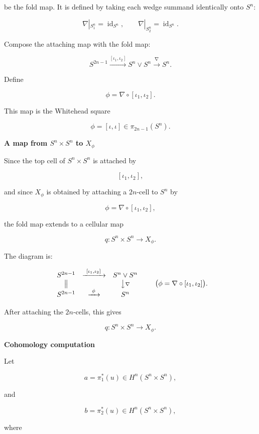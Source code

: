 \begin{solution}
be the fold map. It is defined by taking each wedge summand identically onto \(S^n\):

\[
\nabla|_{S^n_1}=\operatorname{id}_{S^n},
\qquad
\nabla|_{S^n_2}=\operatorname{id}_{S^n}.
\]

Compose the attaching map with the fold map:

\[
S^{2n-1}
\xrightarrow{[\iota_1,\iota_2]}
S^n\vee S^n
\xrightarrow{\nabla}
S^n.
\]

Define

\[
\phi=\nabla\circ[\iota_1,\iota_2].
\]

This map is the Whitehead square

\[
\phi=[\iota,\iota]\in \pi_{2n-1}(S^n).
\]


\medskip
\noindent\textbf{A map from \(S^n\times S^n\) to \(X_\phi\)}\par
\smallskip


Since the top cell of \(S^n\times S^n\) is attached by

\[
[\iota_1,\iota_2],
\]

and since \(X_\phi\) is obtained by attaching a \(2n\)-cell to \(S^n\) by

\[
\phi=\nabla\circ[\iota_1,\iota_2],
\]

the fold map extends to a cellular map

\[
q:S^n\times S^n\longrightarrow X_\phi.
\]

The diagram is:



\[
\begin{array}{ccc}
S^{2n-1}&\xrightarrow{\ [\iota_1,\iota_2]\ }&S^n\vee S^n\\
\big\Vert&&\big\downarrow{\scriptstyle \nabla}\\
S^{2n-1}&\xrightarrow{\ \phi\ }&S^n
\end{array}
\qquad
\bigl(\phi=\nabla\circ[\iota_1,\iota_2]\bigr).
\]



After attaching the \(2n\)-cells, this gives

\[
q:S^n\times S^n\to X_\phi.
\]


\medskip
\noindent\textbf{Cohomology computation}\par
\smallskip


Let

\[
a=\pi_1^*(u)\in H^n(S^n\times S^n),
\]

and

\[
b=\pi_2^*(u)\in H^n(S^n\times S^n),
\]

where


\end{solution}
